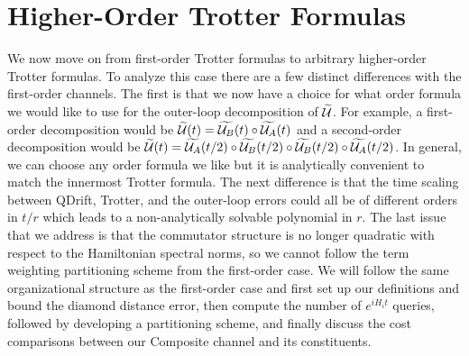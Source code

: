 \section{Higher-Order Trotter Formulas} \label{sec:higher_order_trotter}
We now move on from first-order Trotter formulas to arbitrary higher-order Trotter formulas. To analyze this case there are a few distinct differences with the first-order channels. The first is that we now have a choice for what order formula we would like to use for the outer-loop decomposition of $\widetilde{\mathcal{U}}$. For example, a first-order decomposition would be $\widetilde{\mathcal{U}}(t) = \widetilde{\mathcal{U}_B}(t) \circ \widetilde{\mathcal{U}_A}(t)$ and a second-order decomposition would be $\widetilde{\mathcal{U}}(t) = \widetilde{\mathcal{U}_A}(t/2) \circ \widetilde{\mathcal{U}_B}(t/2) \circ \widetilde{\mathcal{U}_B}(t/2) \circ \widetilde{\mathcal{U}_A}(t/2)$. In general, we can choose any order formula we like but it is analytically convenient to match the innermost Trotter formula. The next difference is that the time scaling between QDrift, Trotter, and the outer-loop errors could all be of different orders in $t/r$ which leads to a non-analytically solvable polynomial in $r$. The last issue that we address is that the commutator structure is no longer quadratic with respect to the Hamiltonian spectral norms, so we cannot follow the term weighting partitioning scheme from the first-order case. We will follow the same organizational structure as the first-order case and first set up our definitions and bound the diamond distance error, then compute the number of $e^{i H_i t}$ queries, followed by developing a partitioning scheme, and finally discuss the cost comparisons between our Composite channel and its constituents. 

